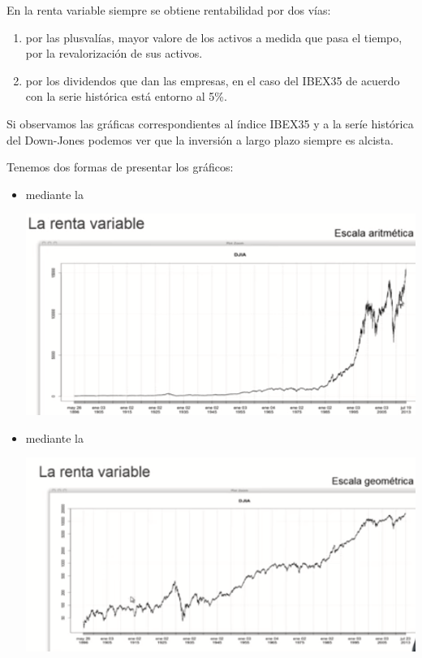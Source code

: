 En la renta variable siempre se obtiene rentabilidad por dos vías:
\begin{enumerate}
    \item por las plusvalías, mayor valore de los activos a medida que pasa el tiempo, por la revalorización de sus activos.
    \item por los dividendos que dan las empresas, en el caso del IBEX35 de acuerdo con la serie histórica está entorno al 5\%.
\end{enumerate}

Si observamos las gráficas correspondientes al índice IBEX35 y a la seríe histórica del Down-Jones podemos ver que la inversión a largo plazo siempre es alcista.

Tenemos dos formas de presentar los gráficos:
\begin{itemize}
    \item mediante la 
    
    \begin{center}
        \includegraphics[scale=0.35]{images/rv-aritmetica.png}    
    \end{center}
    
    \item mediante la 
    
    \begin{center}
        \includegraphics[scale=0.75]{images/rv-geometrica.png}    
    \end{center}
    

\end{itemize}
